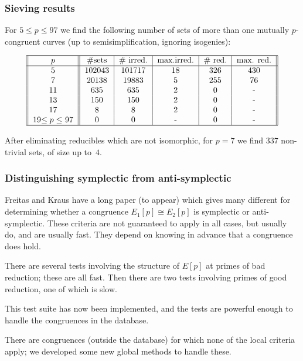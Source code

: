 \documentclass[compress]{beamer}
\newcommand{\high}[1]{\emph{\color{blue}{#1}}}
\begin{document}
\begin{frame}\frametitle{Sieving results}
  For $5\le p\le 97$ we find the following number of sets of more than
  one mutually $p$-congruent curves (up to semisimplification,
  ignoring isogenies):

  \[
  \begin{tabular}{||c||c|c|c|c|c||}
    \hline
    $p$ & \#sets & \# irred. & max.irred. & \# red. & max. red.\\
    \hline
    5 & 102043 & 101717 & 18 & 326 & 430 \\
    7 & 20138 & 19883 & 5 & 255 & 76 \\
    11 & 635 & 635 & 2 & 0 & - \\
    13 & 150 & 150 & 2 & 0 & - \\
    17 & 8 & 8 & 2 & 0 & - \\
    19$\le p\le$ 97 & 0 & 0 & - & 0 & - \\
    \hline
  \end{tabular}
  \]

After eliminating reducibles which are not isomorphic, for $p=7$ we
find $337$ non-trivial sets, of size up to~$4$.
\end{frame}

\begin{frame}\frametitle{Distinguishing symplectic from
    anti-symplectic}

  Freitas and Kraus have a long paper (to appear) which gives many different
  \high{local criteria} for determining whether a congruence
  $E_1[p]\cong E_2[p]$ is symplectic or anti-symplectic.  These
  criteria are not guaranteed to apply in all cases, but usually do,
  and are usually fast.  They depend on knowing in advance that a
  congruence does hold.

\pause\medskip

  There are several tests involving the structure of $E[p]$ at primes
  of bad reduction; these are all fast.  Then there are two tests
  involving primes of good reduction, one of which is slow.

\pause\medskip

  This test suite has now been implemented, and the tests are powerful
  enough to handle \high{all} the congruences in the database.\pause

  There are congruences (outside the database) for which none of the
  local criteria apply; we developed some new global methods to handle
  these.

\end{frame}
\end{document}
